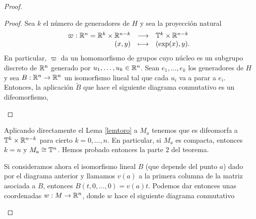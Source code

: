 \begin{proof}
\begin{proof}
  Sea $k$ el número de generadores de $H$ y sea la proyección natural
  \[
    \begin{array}{rcl}
      \varpi: \mathbb{R}^n = \mathbb{R}^k \times \mathbb{R}^{n-k} & \longrightarrow & \mathbb{T}^k \times \mathbb{R}^{n-k} \\
      (x,y) & \longmapsto & (\exp(x), y).
    \end{array}
  \]
  En particular, $\varpi$ da un homomorfismo de grupos cuyo núcleo es un subgrupo discreto de $\mathbb{R}^n$ generado por $u_1,\dots,u_k \in \mathbb{R}^n$. 
  Sean $e_1,\dots,e_k$ los generadores de $H$ y sea $B:\mathbb{R}^n \rightarrow \mathbb{R}^n$ un isomorfismo lineal tal que cada $u_i$ va a parar a $e_i$. Entonces, la aplicación $\tilde{B}$ que hace el siguiente diagrama conmutativo es un difeomorfismo,
  \begin{center}
   \end{center}
  
\end{proof}

Aplicando directamente el Lema \ref{lemtoro} a $M_a$ tenemos que es difeomorfa a $\mathbb{T}^k\times \mathbb{R}^{n-k}$ para cierto $k=0,\dots,n$. En particular, si $M_a$ es compacta, entonces $k=n$ y $M_a\cong \mathbb{T}^n$. Hemos probado entonces la parte $2$ del teorema.

Si consideramos ahora el isomorfismo lineal $B$ (que depende del punto $a$) dado por el diagrama anterior y llamamos $v(a)$ a la primera columna de la matriz asociada a $B$, entonces $B(t,0,\dots,0)=v(a)t$. Podemos dar entonces unas coordenadas $w:M\rightarrow \mathbb{R}^n$, donde $w$ hace el siguiente diagrama conmutativo
\begin{center}
\end{center}


\end{proof}
